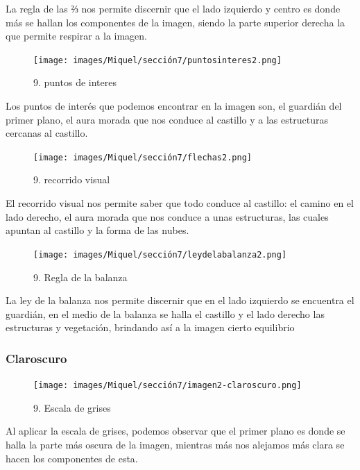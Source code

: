 \documentclass[12pt]{article}
\begin{document}
    La regla de las ⅔ nos permite discernir que el lado izquierdo y centro es donde más se hallan los componentes de la imagen, siendo la parte superior derecha la que permite respirar a la imagen.

    \begin{figure}[H]
      \centering
      \texttt{[image: images/Miquel/sección7/puntosinteres2.png]}
      \caption{\small 9. puntos de interes}
    \end{figure}

    Los puntos de interés que podemos encontrar en la imagen son, el guardián del primer plano, el aura morada que nos conduce al castillo y a las estructuras cercanas al castillo.

    \begin{figure}[H]
      \centering
      \texttt{[image: images/Miquel/sección7/flechas2.png]}
      \caption{\small 9. recorrido visual}
    \end{figure}

    El recorrido visual nos permite saber que todo conduce al castillo: el camino en el lado derecho, el aura morada  que nos conduce a unas estructuras, las cuales apuntan al castillo y la forma de las nubes.

    \begin{figure}[H]
      \centering
      \texttt{[image: images/Miquel/sección7/leydelabalanza2.png]}
      \caption{\small 9. Regla de la balanza}
    \end{figure}

    La ley de la balanza nos permite discernir que en el lado izquierdo se encuentra el guardián, en el medio de la balanza se halla el castillo y el lado derecho las estructuras y vegetación, brindando así a la imagen cierto equilibrio
   
        \subsubsection{Claroscuro}

    \begin{figure}[H]
      \centering
      \texttt{[image: images/Miquel/sección7/imagen2-claroscuro.png]}
      \caption{\small 9. Escala de grises}
    \end{figure}
    
    Al aplicar la escala de grises, podemos observar que el primer plano es donde se halla la parte más oscura de la imagen, mientras más nos alejamos más clara se hacen los componentes de esta.
\end{document}
